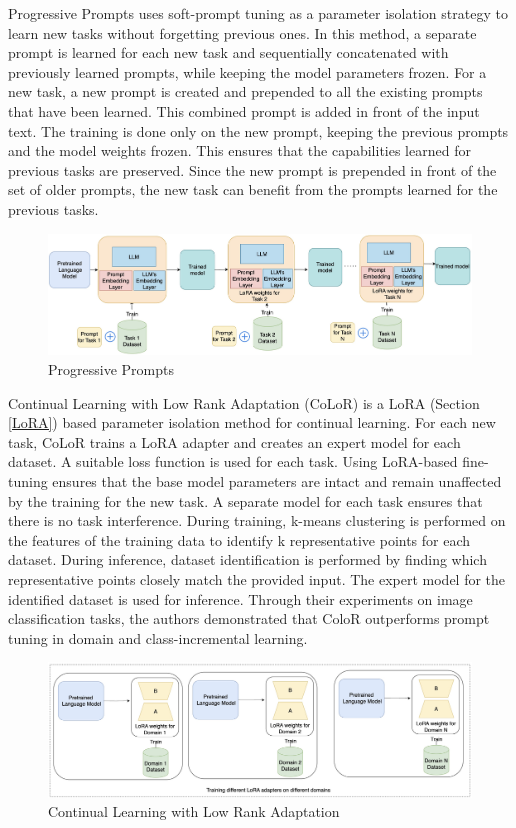 Progressive Prompts \cite{razdaibiedina2023progressive} uses soft-prompt tuning as a parameter isolation strategy to learn new tasks without forgetting previous ones. In this method, a separate prompt is learned for each new task and sequentially concatenated with previously learned prompts, while keeping the model parameters frozen. For a new task, a new prompt is created and prepended to all the existing prompts that have been learned. This combined prompt is added in front of the input text. The training is done only on the new prompt, keeping the previous prompts and the model weights frozen. This ensures that the capabilities learned for previous tasks are preserved. Since the new prompt is prepended in front of the set of older prompts, the new task can benefit from the prompts learned for the previous tasks. 
\begin{figure}[h]
    \centering
    \includegraphics[width=1\textwidth]{Figures/literature_review/progressive_prompt.jpeg} 
    \caption{Progressive Prompts}
    \label{fig:ProgressivePrompts}
\end{figure}

Continual Learning with Low Rank Adaptation (CoLoR) \cite{wistuba2023continual} is a LoRA (Section \ref{LoRA}) based parameter isolation method for continual learning. For each new task, CoLoR trains a LoRA adapter and creates an expert model for each dataset. A suitable loss function is used for each task. Using LoRA-based fine-tuning ensures that the base model parameters are intact and remain unaffected by the training for the new task. A separate model for each task ensures that there is no task interference. During training, k-means clustering is performed on the features of the training data to identify k representative points for each dataset. During inference, dataset identification is performed by finding which representative points closely match the provided input. The expert model for the identified dataset is used for inference. Through their experiments on image classification tasks, the authors demonstrated that ColoR outperforms prompt tuning in domain and class-incremental learning. 
\begin{figure}[h]
    \centering
    \includegraphics[width=1\textwidth]{Figures/literature_review/CoLoR.jpeg} 
    \caption{Continual Learning with Low Rank Adaptation}
    \label{fig:Color}
\end{figure}

